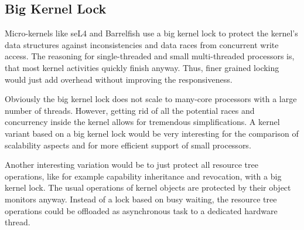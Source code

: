 \subsection{Big Kernel Lock}
Micro-kernels like seL4 and Barrelfish use a big kernel lock to protect the kernel's data structures against inconsistencies and data races from concurrent write access. The reasoning for single-threaded and small multi-threaded processors is, that most kernel activities quickly finish anyway. Thus, finer grained locking would just add overhead without improving the responsiveness. 

Obviously the big kernel lock does not scale to many-core processors with a large number of threads. However, getting rid of all the potential races and concurrency inside the kernel allows for tremendous simplifications. A kernel variant based on a big kernel lock would be very interesting for the comparison of scalability aspects and for more efficient support of small processors.

Another interesting variation would be to just protect all resource tree operations, like for example capability inheritance and revocation, with a big kernel lock. The usual operations of kernel objects are protected by their object monitors anyway. Instead of a lock based on busy waiting, the resource tree operations could be offloaded as asynchronous task to a dedicated hardware thread.






